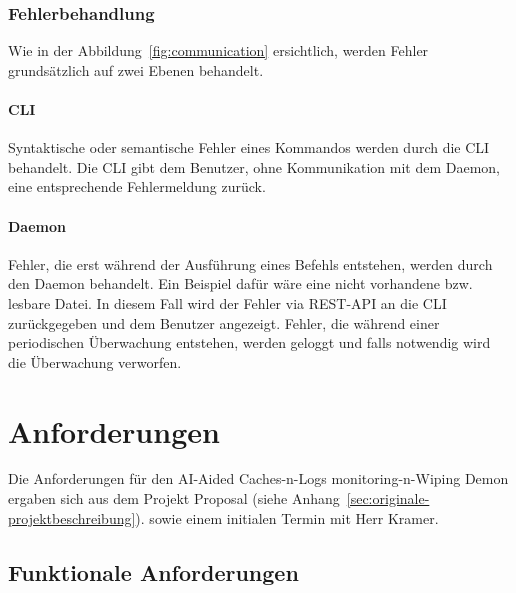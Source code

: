 \documentclass[a4paper,12pt]{report}
\begin{document}
    \subsubsection{Fehlerbehandlung}
    Wie in der Abbildung~\ref{fig:communication} ersichtlich, werden Fehler grundsätzlich auf zwei Ebenen behandelt.

    \paragraph*{CLI}
    Syntaktische oder semantische Fehler eines Kommandos werden durch die CLI behandelt.
    Die CLI gibt dem Benutzer, ohne Kommunikation mit dem Daemon, eine entsprechende Fehlermeldung zurück.

    \paragraph*{Daemon}
    Fehler, die erst während der Ausführung eines Befehls entstehen, werden durch den Daemon behandelt.
    Ein Beispiel dafür wäre eine nicht vorhandene bzw. lesbare Datei.
    In diesem Fall wird der Fehler via REST-API an die CLI zurückgegeben und dem Benutzer angezeigt.
    Fehler, die während einer periodischen Überwachung entstehen, werden geloggt und falls notwendig wird die Überwachung verworfen.

    \clearpage


    \section{Anforderungen}\label{sec:anforderungen}
    Die Anforderungen für den AI-Aided Caches-n-Logs \gls{monitoring}-n-Wiping Demon ergaben sich aus dem Projekt Proposal (siehe Anhang~\ref{sec:originale-projektbeschreibung}).
    sowie einem initialen Termin mit Herr Kramer.

    \subsection{Funktionale Anforderungen}\label{subsec:funktionale-anforderungen}
\end{document}
